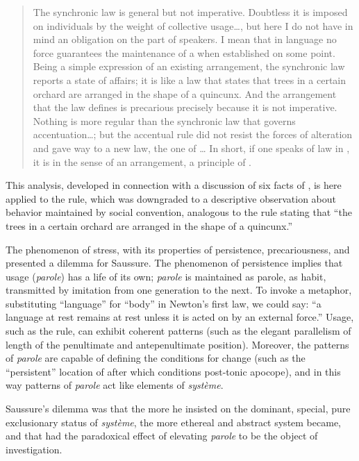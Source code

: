 \documentclass[output=paper,
modfonts
]{LSP/langsci}
\begin{document}
\begin{quote}
The synchronic law is general but not imperative. Doubtless it is
imposed on individuals by the weight of collective usage\ldots{}, but
here I do not have in mind an obligation on the part of speakers. I mean
that in language no force guarantees the maintenance of a 
when established on some point. Being a simple expression of an existing
arrangement, the synchronic law reports a state of affairs; it is like a
law that states that trees in a certain orchard are arranged in the
shape of a quincunx. And the arrangement that the law defines is
precarious precisely because it is not imperative. Nothing is more
regular than the synchronic law that governs  accentuation\ldots{};
but the accentual rule did not resist the forces of alteration and gave
way to a new law, the one of \ldots{} In short, if one speaks of
law in , it is in the sense of an arrangement, a principle of
. \citep[92--93]{DESb}
\end{quote}

This analysis, developed in connection with a discussion of six facts of
, is here applied to the   rule, which was
downgraded to a descriptive observation about behavior maintained by
social convention, analogous to the rule stating that ``the trees in a
certain orchard are arranged in the shape of a quincunx.''

The phenomenon of  stress, with its properties of persistence,
precariousness, and  presented a dilemma for Saussure. The
phenomenon of persistence implies that usage (\emph{parole}) has a life
of its own; \emph{parole} is maintained as parole, as habit, transmitted
by imitation from one generation to the next. To invoke a metaphor,
substituting ``language'' for ``body'' in Newton's first law, we could
say: ``a language at rest remains at rest unless it is acted on by an
external force.'' Usage, such as the   rule, can exhibit
coherent patterns (such as the elegant parallelism of length of the
penultimate and antepenultimate position). Moreover, the patterns of
\emph{parole} are capable of defining the conditions for change (such as
the ``persistent'' location of  after  which conditions
post-tonic apocope), and in this way patterns of \emph{parole} act like
elements of \emph{système}.

Saussure's dilemma was that the more he insisted on the dominant,
special, pure exclusionary status of \emph{système}, the more ethereal
and abstract system became, and that had the paradoxical effect of
elevating \emph{parole} to be the object of investigation.
\end{document}
